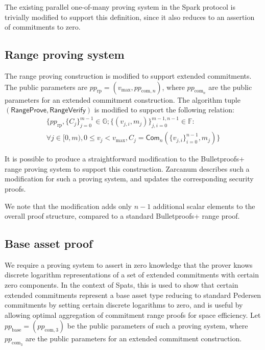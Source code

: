 \documentclass{article}
\newcommand{\G}{\mathbb{G}}
\newcommand{\F}{\mathbb{F}}
\newcommand{\func}[1]{\mathsf{#1}}
\newcommand{\com}{\func{Com}}
\begin{document}
The existing parallel one-of-many proving system in the Spark protocol is trivially modified to support this definition, since it also reduces to an assertion of commitments to zero.


\subsection{Range proving system}

The range proving construction is modified to support extended commitments.
The public parameters are $pp_{\text{rp}} = (v_{\text{max}}, pp_{\text{com},n})$, where $pp_{\text{com}_n}$ are the public parameters for an extended commitment construction.
The algorithm tuple $(\func{RangeProve}, \func{RangeVerify})$ is modified to support the following relation:
\begin{multline*}
\{ pp_{\text{rp}}, \{C_j\}_{j=0}^{m-1} \in \G ; \{(v_{j,i}, m_j)\}_{j,i=0}^{m-1,n-1} \in \F : \\
\forall j \in [0,m), 0 \leq v_j < v_{\text{max}}, C_j = \com_n(\{v_{j,i}\}_{i=0}^{n-1}, m_j) \}
\end{multline*}

It is possible to produce a straightforward modification to the Bulletproofs+ range proving system to support this construction.
Zarcanum \cite{zarcanum} describes such a modification for such a proving system, and updates the corresponding security proofs.

We note that the modification adds only $n-1$ additional scalar elements to the overall proof structure, compared to a standard Bulletproofs+ range proof.


\subsection{Base asset proof}

We require a proving system to assert in zero knowledge that the prover knows discrete logarithm representations of a set of extended commitments with certain zero components.
In the context of Spats, this is used to show that certain extended commitments represent a base asset type reducing to standard Pedersen commitments by setting certain discrete logarithms to zero, and is useful by allowing optimal aggregation of commitment range proofs for space efficiency.
Let $pp_{\text{base}} = (pp_{\text{com},3})$ be the public parameters of such a proving system, where $pp_{\text{com}_3}$ are the public parameters for an extended commitment construction.
\end{document}
